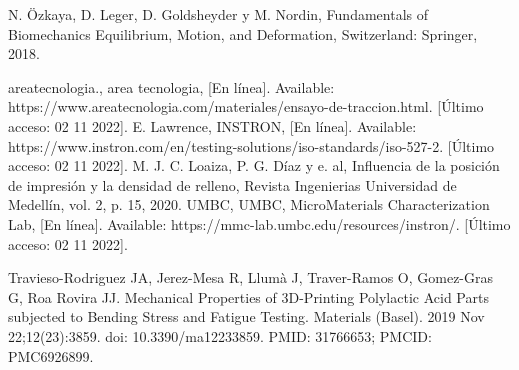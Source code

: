 \documentclass[journal,transmag]{IEEEtran}
\begin{document}
\begin{thebibliography}{1}


  N. Özkaya, D. Leger, D. Goldsheyder y M. Nordin, Fundamentals of Biomechanics Equilibrium, Motion, and Deformation, Switzerland: Springer, 2018. 
 

areatecnologia., area tecnologia, [En línea]. Available: https://www.areatecnologia.com/materiales/ensayo-de-traccion.html. [Último acceso: 02 11 2022].
E. Lawrence, INSTRON, [En línea]. Available: https://www.instron.com/en/testing-solutions/iso-standards/iso-527-2. [Último acceso: 02 11 2022].
M. J. C. Loaiza, P. G. Díaz y e. al, Influencia de la posición de impresión y la densidad de relleno, Revista Ingenierias Universidad de Medellín, vol. 2, p. 15, 2020. 
UMBC, UMBC, MicroMaterials Characterization Lab, [En línea]. Available: https://mmc-lab.umbc.edu/resources/instron/. [Último acceso: 02 11 2022].

Travieso-Rodriguez JA, Jerez-Mesa R, Llumà J, Traver-Ramos O, Gomez-Gras G, Roa Rovira JJ. Mechanical Properties of 3D-Printing Polylactic Acid Parts subjected to Bending Stress and Fatigue Testing. Materials (Basel). 2019 Nov 22;12(23):3859. doi: 10.3390/ma12233859. PMID: 31766653; PMCID: PMC6926899.


\end{thebibliography}
\end{document}
